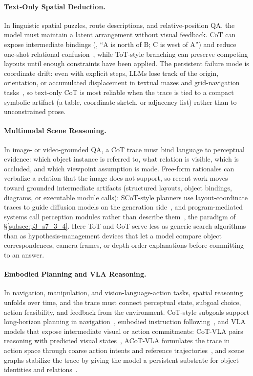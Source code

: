 \paragraph{Text-Only Spatial Deduction.}
In linguistic spatial puzzles, route descriptions, and relative-position QA, the model must maintain a latent arrangement without visual feedback.
CoT can expose intermediate bindings (\eg, ``A is north of B; C is west of A'') and reduce one-shot relational confusion~\cite{hu2023chain}, while ToT-style branching can preserve competing layouts until enough constraints have been applied.
The persistent failure mode is coordinate drift: even with explicit steps, LLMs lose track of the origin, orientation, or accumulated displacement in textual mazes and grid-navigation tasks~\cite{zhang2025mitigating}, so text-only CoT is most reliable when the trace is tied to a compact symbolic artifact (a table, coordinate sketch, or adjacency list) rather than to unconstrained prose.

\paragraph{Multimodal Scene Reasoning.}
In image- or video-grounded QA, a CoT trace must bind language to perceptual evidence: which object instance is referred to, what relation is visible, which is occluded, and which viewpoint assumption is made.
Free-form rationales can verbalize a relation that the image does not support, so recent work moves toward grounded intermediate artifacts (structured layouts, object bindings, diagrams, or executable module calls): SCoT-style planners use layout-coordinate traces to guide diffusion models on the generation side~\cite{chen2026spatialcotgeneration}, and program-mediated systems call perception modules rather than describe them~\cite{hsu2025makes}, the paradigm of §\ref{subsec:p3_s7_3_4}.
Here ToT and GoT serve less as generic search algorithms than as hypothesis-management devices that let a model compare object correspondences, camera frames, or depth-order explanations before committing to an answer.

\paragraph{Embodied Planning and VLA Reasoning.}
In navigation, manipulation, and vision-language-action tasks, spatial reasoning unfolds over time, and the trace must connect perceptual state, subgoal choice, action feasibility, and feedback from the environment.
CoT-style subgoals support long-horizon planning in navigation~\cite{lin2025navcot,liu2025navr1}, embodied instruction following~\cite{lu2023thinkbot,mu2023embodiedgpt}, and VLA models that expose intermediate visual or action commitments: CoT-VLA pairs reasoning with predicted visual states~\cite{zhao2025cotvla}, ACoT-VLA formulates the trace in action space through coarse action intents and reference trajectories~\cite{zhong2026acotvla}, and scene graphs stabilize the trace by giving the model a persistent substrate for object identities and relations~\cite{zhang2025embodiedvsr}.

